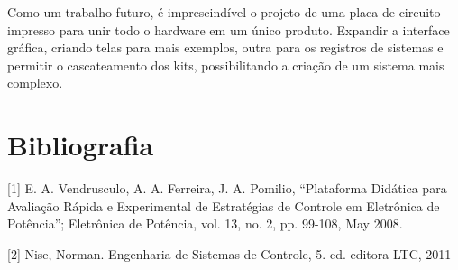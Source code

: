 \documentclass[journal]{IEEEtranTIE}
\begin{document}
Como um trabalho futuro, é imprescindível o projeto de uma placa de circuito impresso para unir todo o hardware em um único produto. Expandir a interface gráfica, criando telas para mais exemplos, outra para os registros de sistemas e permitir o cascateamento dos kits, possibilitando a criação de um sistema mais complexo.


 \section{Bibliografia}

[1] E. A. Vendrusculo, A. A. Ferreira, J. A. Pomilio, “Plataforma Didática para Avaliação Rápida e Experimental de Estratégias de Controle em Eletrônica de Potência”; Eletrônica de Potência, vol. 13, no. 2, pp. 99-108, May 2008.

[2] Nise, Norman. Engenharia de Sistemas de Controle, 5. ed. editora LTC, 2011
\end{document}
